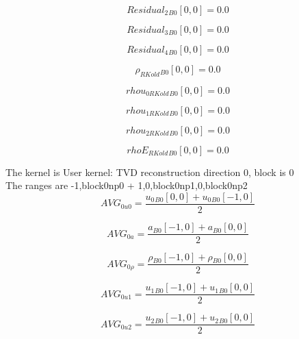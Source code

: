 \documentclass{article}
\begin{document}
\begin{dmath}{Residual_{2}{_{B0}}}[{0,0}] = 0.0\end{dmath}

\begin{dmath}{Residual_{3}{_{B0}}}[{0,0}] = 0.0\end{dmath}

\begin{dmath}{Residual_{4}{_{B0}}}[{0,0}] = 0.0\end{dmath}

\begin{dmath}{\rho_{RKold}{_{B0}}}[{0,0}] = 0.0\end{dmath}

\begin{dmath}{rhou_{0 RKold}{_{B0}}}[{0,0}] = 0.0\end{dmath}

\begin{dmath}{rhou_{1 RKold}{_{B0}}}[{0,0}] = 0.0\end{dmath}

\begin{dmath}{rhou_{2 RKold}{_{B0}}}[{0,0}] = 0.0\end{dmath}

\begin{dmath}{rhoE_{RKold}{_{B0}}}[{0,0}] = 0.0\end{dmath}

\noindent The kernel is User kernel: TVD reconstruction direction 0, block is 0\\\noindent The ranges are -1,block0np0 + 1,0,block0np1,0,block0np2\\\begin{dmath}AVG_{0 u0} = \frac{{u_{0}{_{B0}}}[{0,0}] + {u_{0}{_{B0}}}[{-1,0}]}{2}\end{dmath}

\begin{dmath}AVG_{0 a} = \frac{{a{_{B0}}}[{-1,0}] + {a{_{B0}}}[{0,0}]}{2}\end{dmath}

\begin{dmath}AVG_{0 \rho} = \frac{{\rho{_{B0}}}[{-1,0}] + {\rho{_{B0}}}[{0,0}]}{2}\end{dmath}

\begin{dmath}AVG_{0 u1} = \frac{{u_{1}{_{B0}}}[{-1,0}] + {u_{1}{_{B0}}}[{0,0}]}{2}\end{dmath}

\begin{dmath}AVG_{0 u2} = \frac{{u_{2}{_{B0}}}[{-1,0}] + {u_{2}{_{B0}}}[{0,0}]}{2}\end{dmath}
\end{document}
